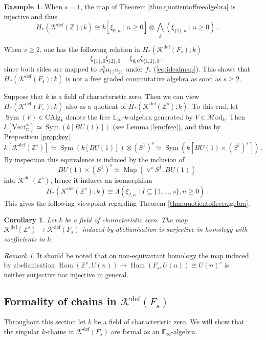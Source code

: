 \documentclass[oneside, a4paper, 12pt]{article}
\numberwithin{equation}{section}
\DeclareMathOperator{\Hom}{Hom}
\DeclareMathOperator{\Sym}{Sym}
\newcommand{\Kdef}{\mathcal{K}^{\mathrm{def}}}
\newcommand{\Mod}{\mathcal{M}\mathrm{od}}
\newcommand{\CAlg}{\mathrm{CAlg}}
\newcommand{\Z}{\mathbb{Z}}
\newcommand{\C}{\mathbb{C}}
\newcommand{\Vect}{\mathrm{Vect}}
\newcommand{\Map}{\operatorname{Map}}
\theoremstyle{plain}
\newtheorem{corollary}[theorem]{Corollary}
\theoremstyle{definition}
\newtheorem{example}[theorem]{Example}
\theoremstyle{remark}
\newtheorem{remark}[theorem]{Remark}
\begin{document}
\begin{example} \label{ex:notfree}
When $s=1$, the map of Theorem \ref{thm:quotientoffreealgebra} is injective and thus
\[
H_\ast(\Kdef(\Z);k) \cong k[\xi_{\emptyset,n}\mid n\geq 0]\otimes {\textstyle \bigwedge_k}(\xi_{\{1\},n}\mid n\geq 0)\, .
\]

When $s\geq 2$, one has the following relation in $H_\ast(\Kdef(F_s);k)$
\[
\xi_{\{1\},0} \xi_{\{2\},0} = \xi_{\emptyset,0} \xi_{\{1,2\},0}\,,
\]
since both sides are mapped to $x_0^2 a_{11} a_{21}$ under $f_\ast$ (\ref{eq:idealmap}). This shows that $H_\ast(\Kdef(F_s);k)$ is not a free graded commutative algebra as soon as $s\geq 2$.
\end{example}


Suppose that $k$ is a field of characteristic zero. Then we can view $H_\ast(\Kdef(F_s);k)$ also as a quotient of $H_\ast(\Kdef(\Z^s);k)$. To this end, let $\Sym(V)\in \CAlg_k$ denote the free $\mathbb{E}_\infty$-$k$-algebra generated by $V\in \Mod_k$. Then $k[\Vect_{\C}^\simeq]\simeq \Sym(k[BU(1)])$ (see Lemma \ref{lem:free}), and thus by Proposition \ref{prop:key}
\[
k[\Kdef(\Z^s)] \simeq \Sym(k[BU(1)]) \otimes (S^1)^s\simeq \Sym(k[BU(1)\times (S^1)^s])\, .
\]
By inspection this equivalence is induced by the inclusion of
\[
BU(1)\times (S^1)^s\simeq \Map(\vee^s S^1,BU(1))
\]
into $\Kdef(\Z^s)$, hence it induces an isomorphism
\[
H_\ast(\Kdef(\Z^s);k) \cong \Lambda(\xi_{I,n} \mid I\subseteq \{1,\dots,s\},n\geq 0)\, .
\]
This gives the following viewpoint regarding Theorem \ref{thm:quotientoffreealgebra}.

\begin{corollary} \label{cor:abelianisation}
Let $k$ be a field of characteristic zero. The map $\Kdef(\Z^s)\to \Kdef(F_s)$ induced by abelianisation is surjective in homology with coefficients in $k$.
\end{corollary}


\begin{remark}
It should be noted that on non-equivariant homology the map induced by abelianisation $\Hom(\Z^s,U(n)) \to \Hom(F_s,U(n))\cong U(n)^s$ is neither surjective nor injective in general.
\end{remark}


\subsection{Formality of chains in $\Kdef(F_s)$} \label{sec:proofofformality}

Throughout this section let $k$ be a field of characteristic zero. We will show that the singular $k$-chains in $\Kdef(F_s)$ are formal as an $\mathbb{E}_\infty$-algebra.
\end{document}
